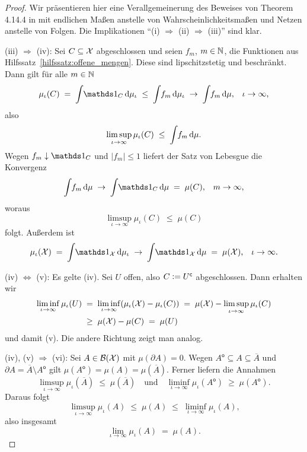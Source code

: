\documentclass[../thesis/thesis.tex]{subfiles}
\begin{document}
	\begin{proof}
		Wir präsentieren hier eine Verallgemeinerung des Beweises von Theorem 4.14.4 in \cite[Section 4.14]{Simon.2015} mit endlichen Maßen 
		anstelle von Wahrscheinlichkeitsmaßen und Netzen anstelle von Folgen. Die Implikationen \enquote{(i) $\Rightarrow$ (ii) $\Rightarrow$ (iii)} sind klar. 
		
		(iii) $\Rightarrow$ (iv): Sei $C \subseteq \mathcal{X}$ abgeschlossen und seien 
		$f_m$, $m \in \mathbb{N}$, die Funktionen aus Hilfssatz~\ref{hilfssatz:offene_mengen}. 
		Diese sind lipschitzstetig und beschränkt.
		Dann gilt für alle $m \in \mathbb{N}$
		$$\mu_\iota(C) \; = \; \measureint{}{\indfct_C}{\mu_\iota} \; \leq \; 
		\measureint{}{f_m}{\mu_\iota} \; \to \;
		\measureint{}{f_m}{\mu} \text{,} \quad \iota \to \infty \text{,}$$
		also 
		$$\limsup_{\iota \to \infty} \mu_\iota(C) \; \leq \; 
		\int_{} \, f_m \, \mathrm{d}\mu \text{.}$$
		Wegen $f_m \convdown \indfct_C$ und $| f_m | \leq 1$ 
		liefert der Satz von Lebesgue die Konvergenz
		$$\measureint{}{f_m}{\mu} \; \to \;
		\measureint{}{\indfct_C}{\mu} \; = \; \mu(C) \text{,} 
		\quad m \to \infty \text{,}$$
		woraus
		$$\limsup_{\iota \to \infty} \mu_\iota(C) \; \leq \; \mu(C)$$
		folgt. Außerdem ist 
		$$\mu_\iota(\X) \; = \; \measureint{}{\indfct_{\X}}{\mu_\iota} \; \to \; \measureint{}{\indfct_{\X}}{\mu} \; = \; \mu(\X) \text{,} 
		\quad \iota \to \infty \text{.}$$
		
		(iv) $\Leftrightarrow$ (v): Es gelte (iv). Sei $U$ offen, also 
		$C \vcentcolon = U^\mathsf{c}$ abgeschlossen. Dann erhalten wir
		\begin{align*}
			\liminf_{\iota \to \infty} \mu_\iota(U) \; &= \; \liminf_{\iota \to \infty} (\mu_\iota(\mathcal{X}) - \mu_\iota(C)) \; = \;
			\mu(\mathcal{X}) - \limsup_{\iota \to \infty} \mu_\iota(C) \\
			&\geq \; 
			\mu(\mathcal{X}) - \mu(C) \; = \; \mu(U)
		\end{align*}
		und damit (v). Die andere Richtung zeigt man analog.
		
		(iv), (v) $\Rightarrow$ (vi): Sei $A \in \mathcal{B}(\mathcal{X})$ mit 
		$\mu(\partial A) = 0$. Wegen
		$A^\mathsf{o} \subseteq A \subseteq \overline{A}$ und 
		$\partial A = \overline{A} \setminus A^\mathsf{o}$ gilt $\mu(A^\mathsf{o}) = 
		\mu(A) = \mu(\overline{A}) \text{.}$
		Ferner liefern die Annahmen
		$$\limsup_{\iota \to \infty} \mu_\iota(\overline{A}) \; \leq \; 
		\mu(\overline{A}) \quad \text{und} \quad 
		\liminf_{\iota \to \infty} \mu_\iota(A^\mathsf{o}) \; \geq \; 
		\mu(A^\mathsf{o}) \text{.}$$
		Daraus folgt
		$$\limsup_{\iota \to \infty} \mu_\iota(A) \; \leq \; 
		\mu(A) \; \leq \; \liminf_{\iota \to \infty} \mu_\iota(A) \text{,}$$
		also insgesamt
		$$\lim_{\iota \to \infty} \mu_\iota(A) \; = \; \mu(A) \text{.}$$
		

\end{proof}
\end{document}
